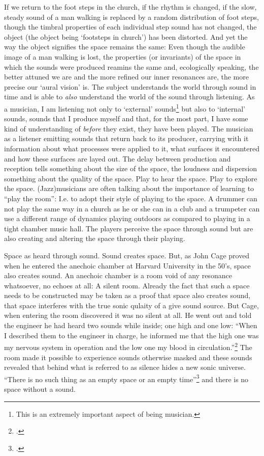 If we return to the foot steps in the church, if the rhythm is changed, if the slow, steady sound of a man walking is replaced by a random distribution of foot steps, though the timbral properties of each individual step sound has not changed, the object (the object being `footsteps in church') has been distorted. And yet the way the object signifies the space remains the same: Even though the audible image of a man walking is lost, the properties (or invariants) of the space in which the sounds were produced reamins the same and, ecologically speaking, the better attuned we are and the more refined our inner resonances are, the more precise our `aural vision' is. The subject understands the world through sound in time and is able to \emph{also} understand the world of the sound through listening. 
As a musician, I am listening not only to `external' sounds\footnote{This is an extremely important aspect of being musician.} but also to `internal' sounds, sounds that I produce myself and that, for the most part, I have some kind of understanding of \emph{before} they exist, they have been played.
The musician as a listener emitting sounds that return back to its producer, carrying with it information about what processes were applied to it, what surfaces it encountered and how these surfaces are layed out. The delay between production and reception tells something about the size of the space, the loudness and dispersion something about the quality of the space. Play to hear the space. Play to explore the space. (Jazz)musicians are often talking about the importance of learning to ``play the room'': I.e. to adopt their style of playing to the space. A drummer can not play the same way in a church as he or she can in a club and a trumpeter can use a different range of dynamics playing outdoors as compared to playing in a tight chamber music hall. The players perceive the space through sound but are also creating and altering the space through their playing.

Space as heard through sound. Sound creates space. But, as John Cage proved when he entered the anechoic chamber at Harvard University in the 50's, space also creates sound. An anechoic chamber is a room void of any resonance whatsoever, no echoes at all: A silent room. Already the fact that such a space needs to be constructed may be taken as a proof that space also creates sound, that space interferes with the true sonic qulaity of a give sound source. But Cage, when entering the room discovered it was no silent at all. He went out and told the engineer he had heard two sounds while inside; one high and one low: ``When I described them to the engineer in charge, he informed me that the high one was my nervous system in operation and the low one my blood in circulation.''\footcite[8]{cage61} The room made it possible to experience sounds otherwise masked and these sounds revealed that behind what is referred to as silence hides a new sonic universe. ``There is no such thing as an empty space or an empty time''\footcite[8]{cage61} and there is no space without a sound.

